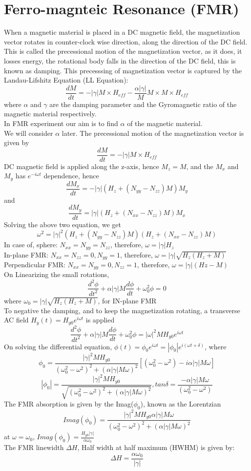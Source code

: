 \documentclass[12pt,a4paper,bold]{thesis}
\theoremstyle{thm}
\theoremstyle{definition}
\begin{document}
\section{Ferro-magnteic Resonance (FMR)}
When a magnetic material is placed in a DC magnetic field, the magnetization vector rotates in counter-clock wise direction, along the direction of the DC field. This is called the precessional motion of the magnetization vector, as it does, it losses energy, the rotational body falls in the direction of the DC field, this is known as damping. This precesssing of magnetization vector is captured by the   Landau-Lifshitz Equation (LL Equation):
\[\frac{dM}{dt}=-|\gamma|M\times H_{eff} - \frac{\alpha |\gamma|}{M}M\times M\times H_{eff}\]
where $\alpha$ and $\gamma$ are the damping parameter and the Gyromagnetic ratio of the magnetic material respectively.\\
In FMR experiment our aim is to find $\alpha$ of the magnetic material.\\
We will consider $\alpha$ later. The precessional motion of the magnetization vector is given by 
\[\frac{dM}{dt}=-|\gamma|M\times H_{eff}\]
DC magnetic field is applied along the z-axis, hence $M_z=M$, and the $M_x$ and $M_y$ has $e^{-i\omega t}$ dependence, hence
\[\frac{dM_x}{dt}=-|\gamma|(H_z + (N_{yy}-N_{zz})M)M_y\]
and
\[\frac{dM_y}{dt}=|\gamma|(H_z + (N_{xx}-N_{zz})M)M_x\]
Solving the above two equation, we get
\[\omega^2=|\gamma|^2(H_z + (N_{yy}-N_{zz})M)(H_z+(N_{xx}-N_{zz})M)\]
In case of, sphere: $N_{xx}=N_{yy}=N_{zz}$, therefore, $\omega =|\gamma|H_z$\\
In-plane FMR: $N_{xx}=N_{zz}=0, N_{yy}=1$, therefore, $\omega =|\gamma|\sqrt{H_z(H_z+M)}$\\
Perpendicular FMR:  $N_{xx}=N_{yy}=0, N_{zz}=1$, therefore, $\omega =|\gamma|(Hz-M)$\\
On Linearizing the small rotations,
\[\frac{d^2\phi}{dt^2}+\alpha|\gamma|M\frac{d\phi}{dt}+\omega_0^2\phi=0\]
where $\omega_0=|\gamma|\sqrt{H_z(H_z+M)}$, for IN-plane FMR\\
To negative the damping, and to keep the magnetization rotating, a transverse AC field $H_y(t)=H_{y0}e^{i\omega t}$ is applied
\[\frac{d^2\phi}{dt^2}+\alpha|\gamma|M\frac{d\phi}{dt}+\omega_0^2\phi =|\omega|^2MH_{y0}e^{i\omega t} \]
On solving the differential equation, $\phi(t)=\phi_0e^{i\omega t}=|\phi_0|e^{i(\omega t+\delta)}$, where\\
\[\phi_0=\frac{|\gamma|^2MH_{y0}}{(\omega_0^2 - \omega^2)^2 + (\alpha|\gamma|M\omega)^2}[(\omega_0^2 - \omega^2)-i\alpha|\gamma|M\omega]\]
\[|\phi_0|=\frac{|\gamma|^2MH_{y0}}{\sqrt{(\omega_0^2 - \omega^2)^2 + (\alpha|\gamma|M\omega)^2}}, tan \delta = \frac{-\alpha|\gamma|M\omega}{(\omega_0^2 - \omega^2)}\]
The FMR absorption is given by the Imag($\phi_0$), known as the Lorentzian
\[Imag(\phi_0)=\frac{|\gamma|^2MH_{y0}\alpha|\gamma|M\omega}{(\omega_0^2 - \omega^2)^2 + (\alpha|\gamma|M\omega)^2}\]
at $\omega=\omega_0$, $Imag(\phi_0)=\frac {H_{y0}|\gamma|}{\alpha \omega_0}$\\
The FMR linewidth $\Delta H$, Half width at half maximum (HWHM) is given by:
\[\Delta H =\frac{\alpha\omega_0}{|\gamma|}\]
\end{document}
